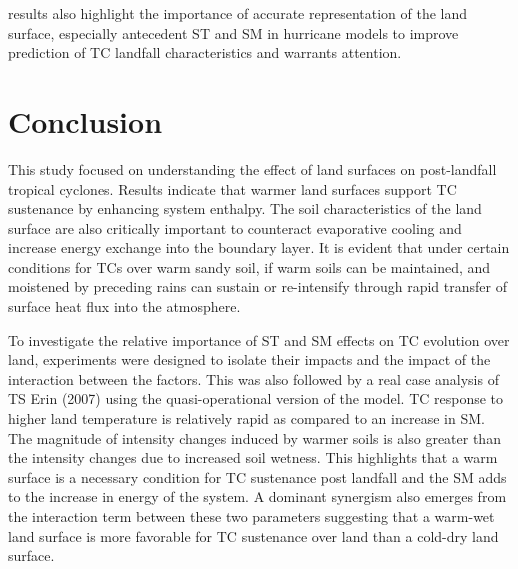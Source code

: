 \documentclass[fleqn,10pt]{wlscirep}
\begin{document}
results also highlight the importance of accurate representation of the land surface, especially antecedent ST and SM in hurricane models to improve prediction of TC landfall characteristics and warrants attention.

\section*{Conclusion}

This study focused on understanding the effect of land surfaces on post-landfall tropical cyclones. Results indicate that warmer land surfaces support TC sustenance by enhancing system enthalpy. The soil characteristics of the land surface are also critically important to counteract evaporative cooling and increase energy exchange into the boundary layer.  It is evident that under certain conditions for TCs over warm sandy soil, if warm soils can be maintained, and moistened by preceding rains can sustain or re-intensify through rapid transfer of surface heat flux into the atmosphere. 

To investigate the relative importance of ST and SM effects on TC evolution over land, experiments were designed to isolate their impacts and the impact of the interaction between the factors. This was also followed by a real case analysis of TS Erin (2007) using the quasi-operational version of the model. TC response to higher land temperature is relatively rapid as compared to an increase in SM. The magnitude of intensity changes induced by warmer soils is also greater than the intensity changes due to increased soil wetness. This highlights that a warm surface is a necessary condition for TC sustenance post landfall and the SM adds to the increase in energy of the system. A dominant synergism also emerges from the interaction term between these two parameters suggesting that a warm-wet land surface is more favorable for TC sustenance over land than a cold-dry land surface.
\end{document}
